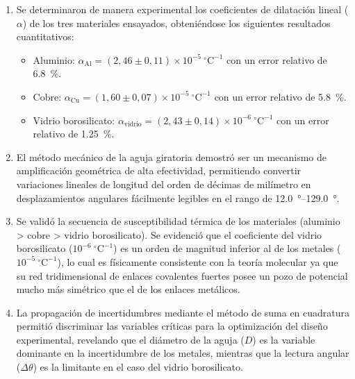 \begin{enumerate}
    \item Se determinaron de manera experimental los coeficientes de dilatación lineal ($\alpha$) de los tres materiales ensayados, obteniéndose los siguientes resultados cuantitativos:
    \begin{itemize}
        \item Aluminio: $\alpha_{\text{Al}} = (2{,}46 \pm 0{,}11) \times 10^{-5}\ ^\circ\text{C}^{-1}$ con un error relativo de \qty{6.8}{\percent}.
        \item Cobre: $\alpha_{\text{Cu}} = (1{,}60 \pm 0{,}07) \times 10^{-5}\ ^\circ\text{C}^{-1}$ con un error relativo de \qty{5.8}{\percent}.
        \item Vidrio borosilicato: $\alpha_{\text{vidrio}} = (2{,}43 \pm 0{,}14) \times 10^{-6}\ ^\circ\text{C}^{-1}$ con un error relativo de \qty{1.25}{\percent}.
    \end{itemize}
    \item El método mecánico de la aguja giratoria demostró ser un mecanismo de amplificación geométrica de alta efectividad, permitiendo convertir variaciones lineales de longitud del orden de décimas de milímetro en desplazamientos angulares fácilmente legibles en el rango de \qtyrange{12.0}{129.0}{\degree}.
    \item Se validó la secuencia de susceptibilidad térmica de los materiales (aluminio > cobre > vidrio borosilicato). Se evidenció que el coeficiente del vidrio borosilicato ($10^{-6}\ ^\circ\text{C}^{-1}$) es un orden de magnitud inferior al de los metales ($10^{-5}\ ^\circ\text{C}^{-1}$), lo cual es físicamente consistente con la teoría molecular ya que su red tridimensional de enlaces covalentes fuertes posee un pozo de potencial mucho más simétrico que el de los enlaces metálicos.
    \item La propagación de incertidumbres mediante el método de suma en cuadratura permitió discriminar las variables críticas para la optimización del diseño experimental, revelando que el diámetro de la aguja ($D$) es la variable dominante en la incertidumbre de los metales, mientras que la lectura angular ($\Delta\theta$) es la limitante en el caso del vidrio borosilicato.
\end{enumerate}